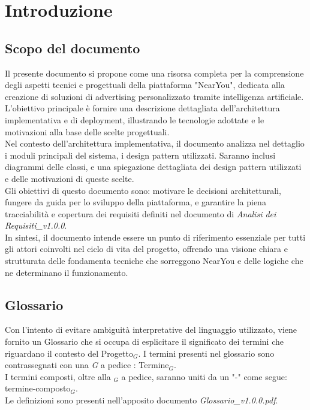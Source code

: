 \documentclass[10pt]{article}
\begin{document}
\newpage
\tableofcontents
\newpage
\listoffigures %
\newpage
\listoftables %
\newpage

\section{Introduzione}
\subsection{Scopo del documento}
Il presente documento si propone come una risorsa completa per la comprensione degli aspetti tecnici e progettuali della piattaforma "NearYou", dedicata alla
creazione di soluzioni di advertising personalizzato tramite intelligenza artificiale. L’obiettivo principale è fornire una descrizione dettagliata dell’architettura
implementativa e di deployment, illustrando le tecnologie adottate e le motivazioni alla base delle scelte progettuali.\\
Nel contesto dell'architettura implementativa, il documento analizza nel dettaglio i moduli principali del sistema, i design pattern utilizzati. Saranno inclusi
diagrammi delle classi, e una spiegazione dettagliata dei design pattern utilizzati e delle motivazioni di queste scelte.\\
Gli obiettivi di questo documento sono: motivare le decisioni architetturali, fungere da guida per lo sviluppo della piattaforma, e garantire la piena tracciabilità e
copertura dei requisiti definiti nel documento di \textit{Analisi dei Requisiti\_v1.0.0}.\\
In sintesi, il documento intende essere un punto di riferimento essenziale per tutti gli attori coinvolti nel ciclo di vita del progetto, offrendo una visione chiara e
strutturata delle fondamenta tecniche che sorreggono NearYou e delle logiche che ne determinano il funzionamento.\\

\subsection{Glossario}
Con l'intento di evitare ambiguità interpretative del linguaggio utilizzato, viene fornito un Glossario che si occupa di esplicitare il significato dei termini che riguardano il contesto del Progetto$_G$. I termini presenti nel glossario sono contrassegnati con una \textit{G} a pedice : Termine$_G$.\\
I termini composti, oltre alla $_G$ a pedice, saranno uniti da un "-" come segue: termine-composto$_G$.\\
Le definizioni sono presenti nell'apposito documento \textit{Glossario\_v1.0.0.pdf}.
\end{document}
